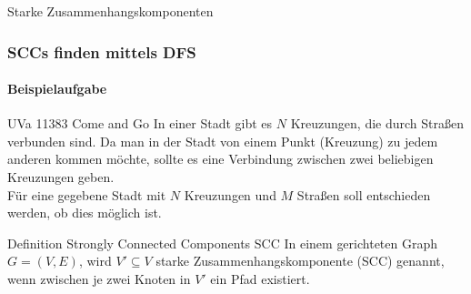 \begin{frame}
	\Huge Starke Zusammenhangskomponenten
\end{frame}

\begin{frame}
	\frametitle{SCCs finden mittels DFS}
	\framesubtitle{Beispielaufgabe}
	\begin{KITexampleblock}{UVa 11383 Come and Go}
		In einer Stadt gibt es $N$  Kreuzungen, die durch Straßen verbunden sind.
		Da man in der Stadt von einem Punkt (Kreuzung) zu jedem anderen kommen möchte, sollte es eine Verbindung zwischen zwei beliebigen Kreuzungen geben. \\
		Für eine gegebene Stadt mit $N$ Kreuzungen und $M$ Straßen soll entschieden werden, ob dies möglich ist.
			
	\end{KITexampleblock}
	\pause 
	\bigskip
	
	\begin{KITinfoblock}{Definition Strongly Connected Components SCC}
		In einem gerichteten Graph $G = (V,E)$, wird $V' \subseteq V$ starke Zusammenhangskomponente (SCC) genannt, wenn zwischen je zwei Knoten in $V'$ ein Pfad existiert.
	\end{KITinfoblock}
	
	
\end{frame}

